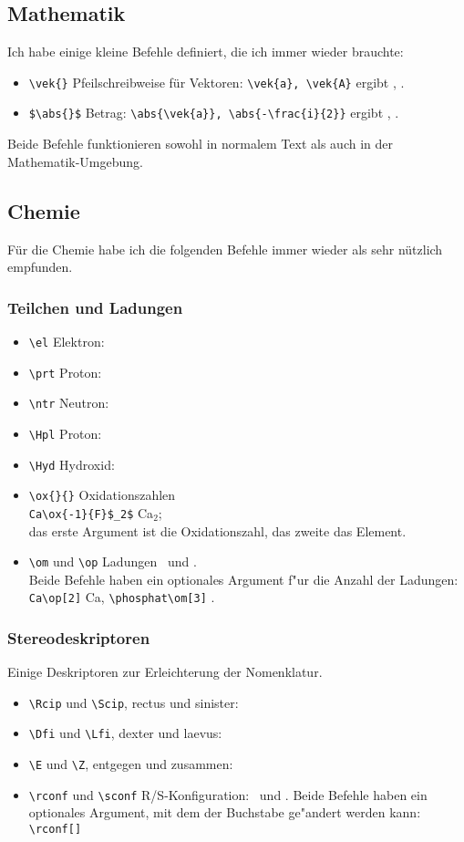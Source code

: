 \documentclass[a4paper,10pt,headsepline]{scrartcl}
\begin{document}
\subsection{Mathematik}
Ich habe einige kleine Befehle definiert, die ich immer wieder brauchte:
\begin{itemize}
 \item \verb=\vek{}= Pfeilschreibweise f\"ur Vektoren: \verb=\vek{a}, \vek{A}= ergibt , .
 \item \verb=$\abs{}$= Betrag: \verb=\abs{\vek{a}}, \abs{-\frac{i}{2}}= ergibt , .
\end{itemize}
Beide Befehle funktionieren sowohl in normalem Text als auch in der Ma\-the\-ma\-tik-Um\-ge\-bung.

\subsection{Chemie}
F\"ur die Chemie habe ich die folgenden Befehle immer wieder als sehr n\"utzlich empfunden.
\subsubsection{Teilchen und Ladungen}
\begin{itemize}
 \item \verb=\el= Elektron: \el
 \item \verb=\prt= Proton: \prt
 \item \verb=\ntr= Neutron: \ntr
 \item \verb=\Hpl= Proton: \Hpl
 \item \verb=\Hyd= Hydroxid: \Hyd
 \item \verb=\ox{}{}= Oxidationszahlen\\
       \verb=Ca\ox{-1}{F}$_2$=  Ca$_2$;\\
       das erste Argument ist die Oxidationszahl, das zweite das Element.
 \item \verb=\om= und \verb=\op= Ladungen \om\ und \op.\\
       Beide Befehle haben ein optionales Argument f"ur die Anzahl der Ladungen:\\\verb=Ca\op[2]=  Ca\op[2], \verb=\phosphat\om[3]=  \phosphat\om[3].
\end{itemize}

\subsubsection{Stereodeskriptoren}\label{sssec:stereo}
Einige Deskriptoren zur Erleichterung der Nomenklatur.
\begin{itemize}
 \item \verb=\Rcip= und \verb=\Scip=, rectus und sinister: \Rcip\ \Scip
 \item \verb=\Dfi= und \verb=\Lfi=, dexter und laevus: \Dfi\ \Lfi
 \item \verb=\E= und \verb=\Z=, entgegen und zusammen: \E\ \Z
 \item \verb=\rconf= und \verb=\sconf= R/S-Konfiguration: \rconf\ und \sconf. Beide Befehle haben ein optionales Argument, mit dem der Buchstabe ge"andert werden kann: \verb=\rconf[]= \rconf[]
\end{itemize}
\end{document}

